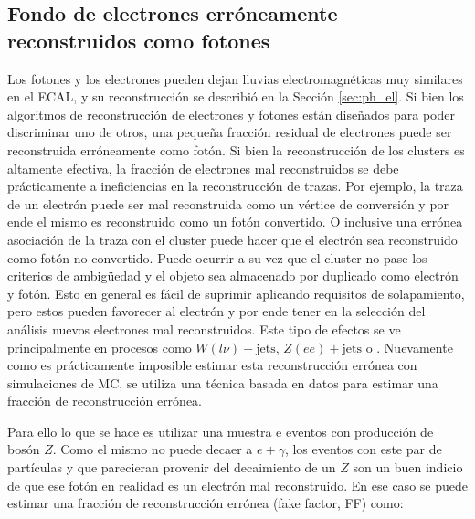 \subsection{Fondo de electrones erróneamente reconstruidos como fotones}

Los fotones y los electrones pueden dejan lluvias electromagnéticas muy
similares en el ECAL, y su reconstrucción se describió en la Sección \ref{sec:ph_el}.
Si bien los algoritmos de reconstrucción de electrones y fotones están diseñados para poder discriminar uno de otros, una pequeña fracción residual de electrones puede ser reconstruida erróneamente como fotón. Si bien la reconstrucción de los clusters es altamente efectiva, la fracción de electrones mal reconstruidos se debe prácticamente a ineficiencias en la reconstrucción de trazas. Por ejemplo, la traza de un electrón puede ser mal reconstruida como un vértice de conversión y por ende el mismo es reconstruido como un fotón convertido. O inclusive una errónea asociación de la traza con el cluster puede hacer que el electrón sea reconstruido como fotón no convertido.
Puede ocurrir a su vez que el cluster no pase los criterios de ambigüedad y el objeto sea almacenado por duplicado como electrón y fotón. Esto en general es fácil de suprimir aplicando requisitos de solapamiento, pero estos pueden favorecer al electrón y por ende tener en la selección del análisis nuevos electrones mal reconstruidos. Este tipo de efectos se ve principalmente en procesos como $W(l\nu)+\text{jets}$, $Z(ee)+\text{jets}$ o \ttbar. Nuevamente como es prácticamente imposible estimar esta reconstrucción errónea con simulaciones de MC, se utiliza una técnica basada en datos para estimar una fracción de reconstrucción errónea.

Para ello lo que se hace es utilizar una muestra e eventos con producción de bosón $Z$. Como el mismo no puede decaer a $e+\gamma$, los eventos con este par de partículas y que parecieran provenir del decaimiento de un $Z$ son un buen indicio de que ese fotón en realidad es un electrón mal reconstruido. En ese caso se puede estimar una fracción de reconstrucción errónea (fake factor, FF) como:

